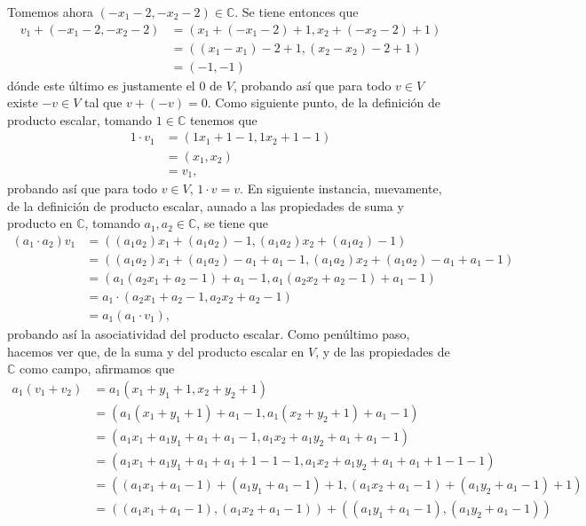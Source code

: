 \documentclass[11pt]{scrartcl}
\begin{document}
\begin{Sol}
    Tomemos ahora $(-x_1-2,-x_2-2) \in \mathbb{C}$. Se tiene entonces que
    \begin{align*}
        v_1+(-x_1-2,-x_2-2)&=(x_1+(-x_1-2)+1,x_2+(-x_2-2)+1) \\
        &=((x_1-x_1)-2+1,(x_2-x_2)-2+1) \\
        &=(-1,-1)
    \end{align*}
    dónde este último es justamente el $0$ de $V$, probando así que para todo $v \in V$ existe $-v \in V$ tal que $v+(-v)=0$.
    Como siguiente punto, de la definición de producto escalar, tomando $1 \in \mathbb{C}$ tenemos que
    \begin{align*}
        1\cdot v_1&=(1x_1+1-1, 1x_2+1-1) \\
        &=(x_1,x_2) \\
        &=v_1,
    \end{align*}
    probando así que para todo $v \in V$, $1\cdot v=v$. En siguiente instancia, nuevamente, de la definición de producto escalar, aunado a las propiedades
    de suma y producto en $\mathbb{C}$,
    tomando $a_1,a_2 \in \mathbb{C}$, se tiene que
    \begin{align*}
        (a_1\cdot a_2)v_1&=((a_1a_2)x_1+(a_1a_2)-1,(a_1a_2)x_2+(a_1a_2)-1) \\
        &=((a_1a_2)x_1+(a_1a_2)-a_1+a_1-1,(a_1a_2)x_2+(a_1a_2)-a_1+a_1-1) \\
        &=(a_1(a_2x_1+a_2-1)+a_1-1,a_1(a_2x_2+a_2-1)+a_1-1) \\
        &=a_1\cdot (a_2x_1+a_2-1,a_2x_2+a_2-1) \\
        &=a_1(a_1\cdot v_1),
    \end{align*}
    probando así la asociatividad del producto escalar. Como penúltimo paso, hacemos ver que,
    de la suma y del producto escalar en $V$, y de las propiedades de $\mathbb{C}$ como campo, afirmamos que
    \begin{align*}
        a_1(v_1+v_2)&=a_1(x_1+y_1+1,x_2+y_2+1) \\
        &=(a_1(x_1+y_1+1)+a_1-1,a_1(x_2+y_2+1)+a_1-1) \\
        &=(a_1x_1+a_1y_1+a_1+a_1-1,a_1x_2+a_1y_2+a_1+a_1-1) \\
        &=(a_1x_1+a_1y_1+a_1+a_1+1-1-1,a_1x_2+a_1y_2+a_1+a_1+1-1-1) \\
        &=((a_1x_1+a_1-1)+(a_1y_1+a_1-1)+1,(a_1x_2+a_1-1)+(a_1y_2+a_1-1)+1) \\
        &=((a_1x_1+a_1-1),(a_1x_2+a_1-1))+((a_1y_1+a_1-1),(a_1y_2+a_1-1)) \\

\end{align*}
\end{Sol}
\end{document}
